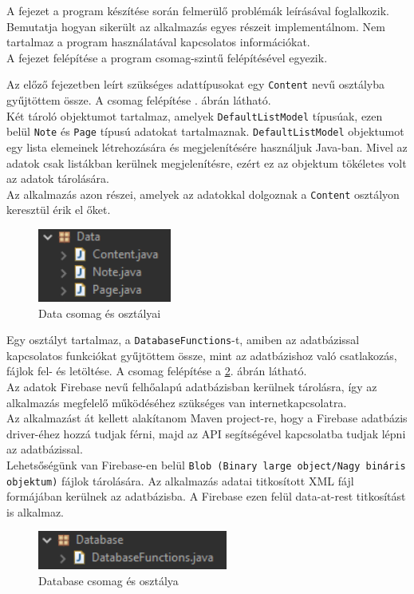 
A fejezet a program készítése során felmerülő problémák leírásával foglalkozik. Bemutatja hogyan sikerült az alkalmazás egyes részeit implementálnom. Nem tartalmaz a program használatával kapcsolatos információkat. 
\\A fejezet felépítése a program csomag-szintű felépítésével egyezik.


Az előző fejezetben leírt szükséges adattípusokat egy \texttt{Content} nevű osztályba gyűjtöttem össze. A csomag felépítése . ábrán látható.
\vspace{5pt}\\Két tároló objektumot tartalmaz, amelyek \texttt{DefaultListModel} típusúak, ezen belül \texttt{Note} és \texttt{Page} típusú adatokat tartalmaznak. \texttt{DefaultListModel} objektumot egy lista elemeinek létrehozására és megjelenítésére használjuk Java-ban. Mivel az adatok csak listákban kerülnek megjelenítésre, ezért ez az objektum tökéletes volt az adatok tárolására.
\vspace{5pt}\\Az alkalmazás azon részei, amelyek az adatokkal dolgoznak a \texttt{Content} osztályon keresztül érik el őket.
\begin{figure}[h]
	\centering
	\includegraphics[scale=0.7]{images/package_data.png}
	\caption{Data csomag és osztályai}
	\label{fig:package_data}
\end{figure}

Egy osztályt tartalmaz, a \texttt{DatabaseFunctions}-t, amiben az adatbázissal kapcsolatos funkciókat gyűjtöttem össze, mint az adatbázishoz való csatlakozás, fájlok fel- és letöltése. A csomag felépítése a \ref{fig:package_database}. ábrán látható.
\vspace{5pt}\\Az adatok Firebase nevű felhőalapú adatbázisban kerülnek tárolásra, így az alkalmazás megfelelő működéséhez szükséges van internetkapcsolatra.
\\Az alkalmazást át kellett alakítanom Maven project-re, hogy a Firebase adatbázis driver-éhez hozzá tudjak férni, majd az API segítségével kapcsolatba tudjak lépni az adatbázissal.
\\Lehetsőségünk van Firebase-en belül \texttt{Blob (Binary large object/Nagy bináris objektum)} fájlok tárolására. Az alkalmazás adatai titkosított XML fájl formájában kerülnek az adatbázisba. A Firebase ezen felül data-at-rest titkosítást is alkalmaz.
\begin{figure}[h]
	\centering
	\includegraphics[scale=0.7]{images/package_database.png}
	\caption{Database csomag és osztálya}
	\label{fig:package_database}
\end{figure}

